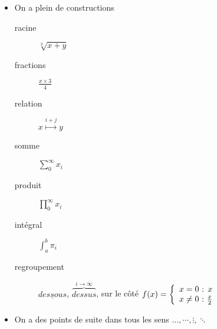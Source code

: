 \begin{frame}[allowframebreaks]
\begin{itemize}
  \item On a plein de constructions

    \begin{description}
    \item[racine] $ \sqrt[3]{x + y} $
    \item[fractions] $ \frac{x\times 3}{4} $
    \item[relation] $ x \stackrel{i+j}{\longmapsto} y $
    \item[somme] $ \sum_{0}^{\infty} x_{i} $
    \item[produit] $ \prod_{0}^{\infty} x_{i} $
    \item[intégral] $ \int_{a}^{b} \pi_{i} $
    \item[regroupement]
      $ \underline{dessous} $,
      $ \overbrace{dessus}^{i\rightarrow\infty} $,
      sur le côté
      \begin{math} %
        f(x) = \left\{
          \begin{array}{l@{~:~}r}
            x = 0 & x \\
            x \neq 0 & \frac{x}{2}
          \end{array}
        \right.
      \end{math}
    \end{description}

  \item On a des points de suite dans tous les sens $ \dots, \cdots, \vdots, \ddots $
  \end{itemize}
\end{frame}


